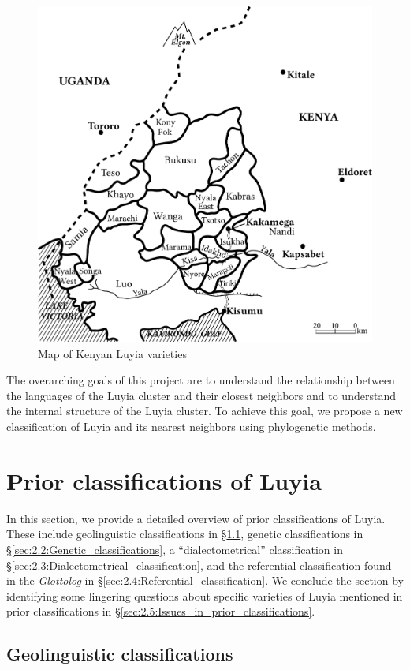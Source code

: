 \documentclass[output=paper]{langscibook}
\begin{document}
\begin{figure}
  \caption{Map of Kenyan Luyia varieties \citep[35]{heine_language_1980}\label{fig:10:KenyanLuyia}}
  \includegraphics[width=.66\textwidth]{figures/Kenyan-Luyia-Varieties.pdf}
\end{figure}

The overarching goals of this project are to understand the relationship between the languages of the Luyia cluster and their closest neighbors and to understand the internal structure of the Luyia cluster. To achieve this goal, we propose a new classification of Luyia and its nearest neighbors using phylogenetic methods.  

\section{Prior classifications of Luyia}
\label{sec:2:Prior_classifications}

In this section, we provide a detailed overview of prior classifications of Luyia. These include geolinguistic classifications in \S\ref{sec:2.1:Geolinguistic_classifications}, genetic classifications in \S\ref{sec:2.2:Genetic_classifications}, a “dialectometrical” classification in \S\ref{sec:2.3:Dialectometrical_classification}, and the referential classification found in the \textit{Glottolog} in \S\ref{sec:2.4:Referential_classification}. We conclude the section by identifying some lingering questions about specific varieties of Luyia mentioned in prior classifications in \S\ref{sec:2.5:Issues_in_prior_classifications}.

\subsection{Geolinguistic classifications \citep{guthrie_classification_1948,guthrie_comparative_1967,maho_nugl_2009,lewis_ethnologue:_2016}}
\label{sec:2.1:Geolinguistic_classifications}
\end{document}
